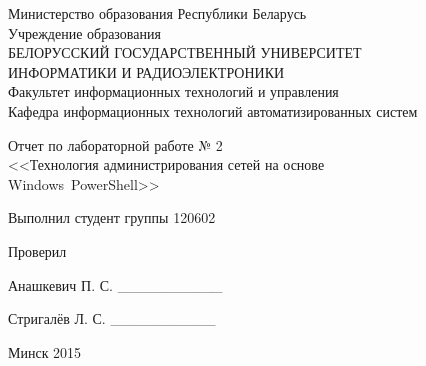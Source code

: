 \thispagestyle{empty}
\setlength{\parindent}{0ex} %

\begin{center}
  Министерство образования Республики Беларусь \\
  \vspace{0.5ex}
  Учреждение образования \\
  БЕЛОРУССКИЙ ГОСУДАРСТВЕННЫЙ УНИВЕРСИТЕТ \\
  ИНФОРМАТИКИ И РАДИОЭЛЕКТРОНИКИ \\
  \vspace{0.5ex}
  Факультет информационных технологий и управления \\
  \vspace{0.5ex}
  Кафедра информационных технологий автоматизированных систем
\end{center}

\vspace{50mm}

\begin{center}
  Отчет по лабораторной работе № 2 \\
  <<Технология администрирования сетей на основе \\ Windows~PowerShell>>
\end{center}

\vspace{65mm}

\begin{minipage}{.55\linewidth}
    Выполнил студент группы 120602

    \smallskip

    Проверил
\end{minipage}
\hfill
\begin{minipage}{.4\linewidth}
  \begin{flushright}
    Анашкевич П. С. \_\_\_\_\_\_\_\_\_\_

    \smallskip

    Стригалёв Л. С. \_\_\_\_\_\_\_\_\_\_
  \end{flushright}
\end{minipage}

\vspace{40mm}
\begin{center}
  Минск 2015
\end{center}

\setlength{\parindent}{1.25cm} %

\newpage
